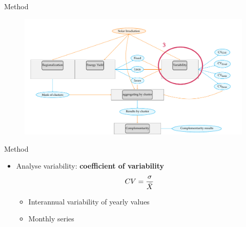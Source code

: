 \documentclass{beamer}%
\begin{document}
\begin{frame}[fragile]{Method}
\begin{figure}  
\includegraphics[scale=0.45]{multi_step4.pdf}
\end{figure}
\end{frame}

\begin{frame}[fragile]{Method}
   \begin{itemize}
\item[] Analyse variability: \textbf{\alert{coefficient of variability}}
  \begin{equation} \small{CV=\frac{\sigma}{\bar{X}}}
  \end{equation}  
     \begin{itemize}
     \item Interannual variability of yearly values
     \item Monthly series  
     \end{itemize}
\end{itemize}
\end{frame}
\end{document}
